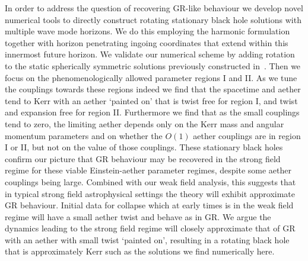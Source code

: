 \documentclass[12pt]{article}
\numberwithin{equation}{section}
\begin{document}
In order to address the question of recovering GR-like behaviour we develop novel numerical tools to directly construct rotating stationary black hole solutions with multiple wave mode horizons. 
We do this employing the harmonic formulation~\cite{Headrick:2009pv} together with horizon penetrating ingoing coordinates that extend within this innermost future horizon.  
%
We validate our numerical scheme by adding rotation to the static spherically symmetric solutions previously constructed in~\cite{Barausse:2011pu}. Then we focus on the phenomenologically allowed parameter regions I and II. As we tune the couplings towards these regions indeed we find that the spacetime and aether tend to Kerr with an aether `painted on' that is twist free for region I, and twist and expansion free for region II. Furthermore we find that as the small couplings tend to zero, the limiting aether depends only on 
the Kerr mass and angular momentum parameters and on whether the $O(1)$ aether couplings are in region I or II, but not on the value of those couplings.
These stationary black holes confirm our picture that GR behaviour may be recovered in the strong field regime for these viable Einstein-aether parameter regimes, despite some aether couplings being large. 
%
Combined with our weak field analysis, this suggests that in typical strong field astrophysical settings the theory will exhibit approximate GR behaviour. Initial data for collapse which at early times is in the weak field regime will have a small aether twist and behave as in GR. We argue the dynamics leading to the strong field regime will closely approximate that of GR with an aether with small twist `painted on', resulting in a rotating black hole that is approximately Kerr such as the solutions we find numerically here.
\end{document}

